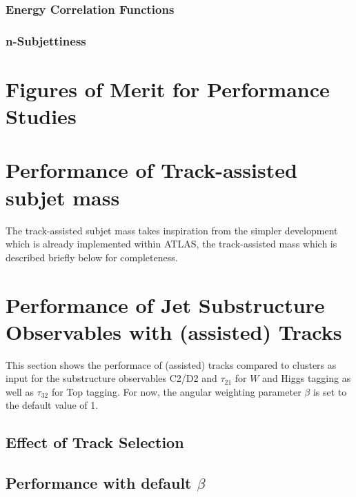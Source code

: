 \documentclass[UKenglish,texlive=2013]{\ATLASLATEXPATH atlasdoc}
\begin{document}


\subsubsection{Energy Correlation Functions}\label{subsec:ECF}


\subsubsection{n-Subjettiness}\label{subsec:nSub}


\section{Figures of Merit for Performance Studies}\label{sec:FoM}


\clearpage
\section{Performance of Track-assisted subjet mass}
\label{sec:mtas}
The track-assisted subjet mass takes inspiration from the simpler development which is already implemented within ATLAS, the track-assisted mass which is described briefly below for completeness.


\clearpage
\section{Performance of Jet Substructure Observables with (assisted) Tracks}\label{sec:def_beta}
This section shows the performace of (assisted) tracks compared to clusters as input for the substructure observables C2/D2 and $\tau_{21}$ for $W$ and Higgs tagging as well as $\tau_{32}$ for Top tagging. For now, the angular weighting parameter $\beta$ is set to the default value of 1.
\subsection{Effect of Track Selection}


\subsection{Performance with default $\beta$}

\end{document}
